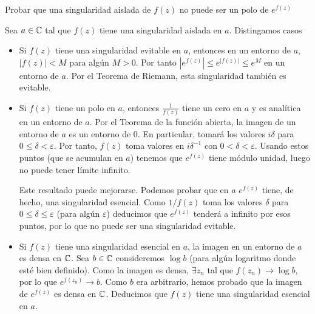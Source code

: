 \documentclass[twoside]{article}
\begin{document}
\begin{ejercicio}{3}
Probar que una singularidad aislada de $f(z)$ no puede ser un polo de $e^{f(z)}$ 
\end{ejercicio}
\begin{solucion}
Sea $a\in \mathbb{C}$ tal que $f(z)$ tiene una singularidad aislada en $a$. Distingamos casos
\begin{itemize}
\item Si $f(z)$ tiene una singularidad evitable en $a$, entonces en un entorno de $a$, $|f(z)|<M$ para algún $M>0$. Por tanto $|e^{f(z)}| \leq e^{|f(z)|}\leq e^M$ en un entorno de $a$. Por el Teorema de Riemann, esta singularidad también es evitable.
\item Si $f(z)$ tiene un polo en $a$, entonces $\frac{1}{f(z)}$ tiene un cero en $a$ y es analítica en un entorno de $a$. Por el Teorema de la función abierta, la imagen de un entorno de $a$ es un entorno de $0$. En particular, tomará los valores $i\delta$ para $0\leq \delta < \varepsilon$. Por tanto, $f(z)$ toma valores en $i\delta^{-1}$ con $0<\delta<\varepsilon$. Usando estos puntos (que se acumulan en $a$) tenemos que  $e^{f(z)}$ tiene módulo unidad, luego no puede tener límite infinito. 

Este resultado puede mejorarse. Podemos probar que en $a$ $e^{f(z)}$ tiene, de hecho, una singularidad esencial. Como $1/f(z)$ toma los valores $\delta$ para $0\leq \delta \leq \varepsilon$ (para algún $\varepsilon$) deducimos que $e^{f(z)}$ tenderá a infinito por esos puntos, por lo que no puede ser una singularidad evitable.

\item Si $f(z)$ tiene una singularidad esencial en $a$, la imagen en un entorno de $a$ es densa en $\mathbb{C}$. Sea $b\in \mathbb{C}$ consideremos $\log b$ (para algún logaritmo donde esté bien definido). Como la imagen es densa, $\exists z_n$ tal que $f(z_n) \to \log b$, por lo que $e^{f(z_n)}\to b$. Como $b$ era arbitrario, hemos probado que la imagen de $e^{f(z)}$ es densa en $\mathbb{C}$. Deducimos que $f(z)$ tiene una singularidad esencial en $a$.
\end{itemize} 
\end{solucion}
\newpage
\end{document}
